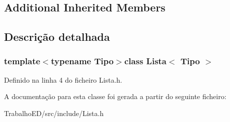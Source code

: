 \subsection*{Additional Inherited Members}


\subsection{Descrição detalhada}
\subsubsection*{template$<$typename Tipo$>$class Lista$<$ Tipo $>$}



Definido na linha 4 do ficheiro Lista.\-h.



A documentação para esta classe foi gerada a partir do seguinte ficheiro\-:\begin{DoxyCompactItemize}
\item 
Trabalho\-E\-D/src/include/Lista.\-h\end{DoxyCompactItemize}
